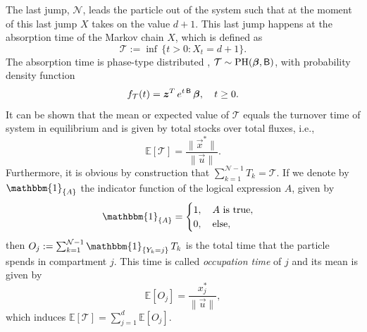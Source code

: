 \documentclass[smallextended]{svjour3}
\makeatletter
\renewcommand*{\eqref}[1]{%
  \hyperref[{#1}]{\textup{\tagform@{\ref*{#1}}}}%
}
\newcommand{\E}{\mathbb{E}}
\newcommand{\TT}{\mathcal{T}}
\newcommand{\PH}{\operatorname{PH}}
\newcommand{\vnorms}[1]{\|#1\|}
\newcommand{\ie}{i.e.}
\newcommand{\pdf}{probability density function}
\makeatother
\begin{document}
The last jump, $\mathcal{N}$, leads the particle out of the system such that at the moment of this last jump $X$ takes on the value $d+1$.
This last jump happens at the absorption time of the Markov chain $X$, which is defined as
\begin{equation*}
   \TT := \inf\,\{t>0: X_t=d+1\}.
\end{equation*}
The absorption time is phase-type distributed \citep{Neuts1981}, $\TT\sim\PH(\vec{\beta},\tens{B})$, with \pdf
\begin{equation*}
  f_{\TT}(t) = \vec{z}^T\,e^{t\,\tens{B}}\,\vec{\beta},\quad t\geq0.
\end{equation*}
It can be shown \citep[Section 3.2]{Metzler2018MGS} that the mean or expected value of $\TT$ equals the turnover time \citep{Sierra2016GlobChangBiol} of system \eqref{eqn:lin_CS_sys} in equilibrium and is given by total stocks over total fluxes, \ie, 
\begin{equation*}
  \E\left[\TT\right] = \frac{\vnorms{\vec{x}^\ast}}{\vnorms{\vec{u}}}.
\end{equation*}
Furthermore, it is obvious by construction that $\sum_{k=1}^{\mathcal{N}-1} T_k = \TT$.
If we denote by $\mathbbm{1}_{\{A\}}$ the indicator function of the logical expression $A$, given by
\begin{equation*}
  \mathbbm{1}_{\{A\}} =
  \begin{cases}
    1, \quad A\text{ is true},\\
    0, \quad\text{else},
  \end{cases}
\end{equation*}
then $O_j:=\sum_{k=1}^{\mathcal{N}-1} \mathbbm{1}_{\{Y_k=j\}}\,T_k$ is the total time that the particle spends in compartment $j$.
This time is called \emph{occupation time} of $j$ and its mean is given by \citep[Section 3.3]{Metzler2018MGS}
\begin{equation}
  \label{eqn:occupation_time}
  \E\left[O_j\right] = \frac{x^\ast_j}{\vnorms{\vec{u}}},
\end{equation}
which induces $\E\left[\TT\right] = \sum_{j=1}^d \E\left[O_j\right]$.
\end{document}
